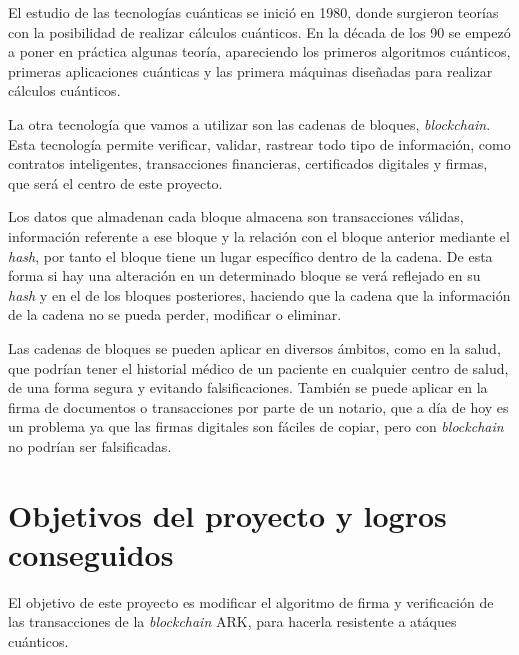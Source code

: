El estudio de las tecnologías cuánticas se inició en 1980, donde surgieron teorías con la posibilidad de realizar cálculos cuánticos. En la década de los 90 se empezó a poner en práctica algunas teoría, apareciendo los primeros algoritmos cuánticos, primeras aplicaciones cuánticas y las primera máquinas diseñadas para realizar cálculos cuánticos.

La otra tecnología que vamos a utilizar son las cadenas de bloques, \textit{blockchain}. Esta tecnología permite verificar, validar, rastrear todo tipo de información, como contratos inteligentes, transacciones financieras, certificados digitales y firmas, que será el centro de este proyecto.

Los datos que almadenan cada bloque almacena son transacciones válidas, información referente a ese bloque y la relación con el bloque anterior mediante el \textit{hash}, por tanto el bloque tiene un lugar específico dentro de la cadena. De esta forma si hay una alteración en un determinado bloque se verá reflejado en su \textit{hash} y en el de los bloques posteriores, haciendo que la cadena que la información de la cadena no se pueda perder, modificar o eliminar. 

Las cadenas de bloques se pueden aplicar en diversos ámbitos, como en la salud, que podrían tener el historial médico de un paciente en cualquier centro de salud, de una forma segura y evitando falsificaciones. También se puede aplicar en la firma de documentos o transacciones por parte de un notario, que a día de hoy es un problema ya que las firmas digitales son fáciles de copiar, pero con \textit{blockchain} no podrían ser falsificadas.







\section{Objetivos del proyecto y logros conseguidos}
\label{sec:objetivos}
El objetivo de este proyecto es modificar el algoritmo de firma y verificación de las transacciones de la \textit{blockchain} ARK, para hacerla resistente a atáques cuánticos.

